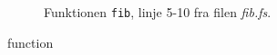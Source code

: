 \documentclass{article}
\begin{document}
\begin{figure}[H!]
  
  \centering
  \caption{Funktionen \texttt{fib}, linje 5-10 fra filen \textit{fib.fs}.}
\end{figure}
function
\end{document}
